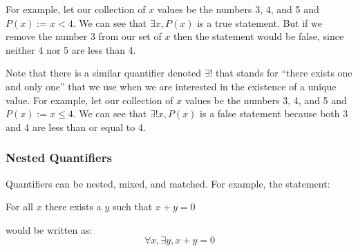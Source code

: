 \documentclass[letterpaper,12pt,fleqn]{article}
\begin{document}
For example, let our collection of $x$ values be the numbers 3, 4, and 5 and
$P(x):=x<4$. We can see that $\exists x,P(x)$ is a true statement. But if we
remove the number 3 from our set of $x$ then the statement would be false, since
neither 4 nor 5 are less than 4.

Note that there is a similar quantifier denoted $\exists!$ that stands for
``there exists one and only one'' that we use when we are interested in the
existence of a unique value. For example, let our collection of $x$ values be
the numbers 3, 4, and 5 and $P(x):=x\le4$. We can see that $\exists! x,P(x)$ is
a false statement because both 3 and 4 are less than or equal to 4.

\subsubsection*{Nested Quantifiers}

Quantifiers can be nested, mixed, and matched. For example, the statement:

\hspace{0.5in}For all $x$ there exists a $y$ such that $x+y=0$

would be written as:
\[\forall x,\exists y,x+y=0\]
\end{document}

